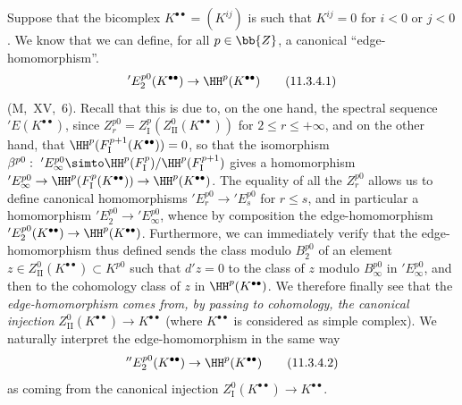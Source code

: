 \begin{env}[11.3.4]
\label{0.11.3.4}
Suppose that the bicomplex $K^{\bullet\bullet}=(K^{ij})$ is such that $K^{ij}=0$ for $i<0$ or $j<0$.
We know that we can define, for all $p\in\bb{Z}$, a canonical ``edge-homomorphism''.
\[
\label{0.11.3.4.1}
  'E_2^{p0}(K^{\bullet\bullet})
  \rightarrow \HH^{p}(K^{\bullet\bullet})
\tag{11.3.4.1}
\]
(M,~XV,~6).
Recall that this is due to, on the one hand, the spectral sequence
$'E(K^{\bullet\bullet})$, since $Z_r^{p0}=Z_{\mathrm{I}}^{p}(Z_{\mathrm{II}}^{0}(K^{\bullet\bullet}))$ for $2\leq r \leq +\infty$, and on the other hand, that $\HH^{p}(F_\mathrm{I}^{p+1}(K^{\bullet\bullet})) = 0$, so that the isomorphism $\beta^{p0}:\ 'E_\infty^{p0} \simto \HH^{p}(F_\mathrm{I}^p)/\HH^{p}(F_\mathrm{I}^{p+1})$ gives a homomorphism $'E_\infty^{p0} \rightarrow \HH^{p}(F_\mathrm{I}^p(K^{\bullet\bullet})) \rightarrow \HH^{p}(K^{\bullet\bullet})$.
The equality of all the $Z_r^{p0}$ allows us to define canonical homomorphisms $'E_r^{p0} \rightarrow 'E_s^{p0}$ for $r \leq s$, and in particular a homomorphism $'E_2^{p0} \rightarrow 'E_\infty^{p0}$, whence by composition the edge-homomorphism $'E_2^{p0}(K^{\bullet\bullet}) \rightarrow \HH^{p}(K^{\bullet\bullet})$.
Furthermore, we can immediately verify that the edge-homomorphism thus defined sends the class modulo $B_2^{p0}$ of an element $z\in Z_\mathrm{II}^0(K^{\bullet\bullet})\subset K^{p0}$ such that $d'z=0$ to the class of $z$ modulo $B_\infty^{p0}$ in $'E_\infty^{p0}$, and then to the cohomology class of $z$ in $\HH^p(K^{\bullet\bullet})$.
We therefore finally see that the \emph{edge-homomorphism}  \emph{comes from, by passing to cohomology, the canonical injection} $Z_\mathrm{II}^0(K^{\bullet\bullet}) \rightarrow K^{\bullet\bullet}$  (where $K^{\bullet\bullet}$ is considered as simple complex).
We naturally interpret the edge-homomorphism in the same way 
\[
\label{0.11.3.4.2}
  ''E_2^{p0}(K^{\bullet\bullet})
  \rightarrow \HH^{p}(K^{\bullet\bullet})
\tag{11.3.4.2}
\]
as coming from the canonical injection $Z_\mathrm{I}^0(K^{\bullet\bullet}) \rightarrow K^{\bullet\bullet}$.
\end{env}

